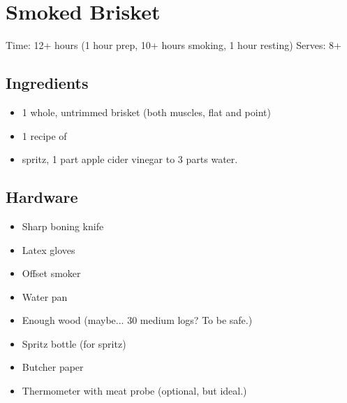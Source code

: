 \section{Smoked Brisket}
\label{smokedBrisket}
\setcounter{secnumdepth}{0}
Time: 12+ hours (1 hour prep, 10+ hours smoking, 1 hour resting)
Serves: 8+

\begin{multicols}{2}
\subsection*{Ingredients}
\begin{itemize}
    \item 1 whole, untrimmed brisket (both muscles, flat and point)
    \item 1 recipe of 
    \item spritz, 1 part apple cider vinegar to 3 parts water.
\end{itemize}

\subsection*{Hardware}
\begin{itemize}
    \item Sharp boning knife
    \item Latex gloves
    \item Offset smoker
    \item Water pan
    \item Enough wood (maybe... 30 medium logs? To be safe.)
    \item Spritz bottle (for spritz)
    \item Butcher paper
    \item Thermometer with meat probe (optional, but ideal.)
\end{itemize}
\clearpage


\end{multicols}

